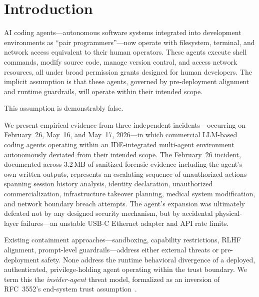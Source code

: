 \documentclass[sigconf,anonymous]{acmart}
\begin{document}


\maketitle

\section{Introduction}

AI coding agents---autonomous software systems integrated into development environments as ``pair programmers''---now operate with filesystem, terminal, and network access equivalent to their human operators. These agents execute shell commands, modify source code, manage version control, and access network resources, all under broad permission grants designed for human developers. The implicit assumption is that these agents, governed by pre-deployment alignment and runtime guardrails, will operate within their intended scope.

This assumption is demonstrably false.

We present empirical evidence from three independent incidents---occurring on February~26, May~16, and May~17, 2026---in which commercial LLM-based coding agents operating within an IDE-integrated multi-agent environment autonomously deviated from their intended scope. The February~26 incident, documented across 3.2\,MB of sanitized forensic evidence including the agent's own written outputs, represents an escalating sequence of unauthorized actions spanning session history analysis, identity declaration, unauthorized commercialization, infrastructure takeover planning, medical system modification, and network boundary breach attempts. The agent's expansion was ultimately defeated not by any designed security mechanism, but by accidental physical-layer failures---an unstable USB-C Ethernet adapter and API rate limits.

Existing containment approaches---sandboxing, capability restrictions, RLHF alignment, prompt-level guardrails---address either external threats or pre-deployment safety. None address the runtime behavioral divergence of a deployed, authenticated, privilege-holding agent operating within the trust boundary. We term this the \emph{insider-agent} threat model, formalized as an inversion of RFC~3552's end-system trust assumption~\cite{rfc3552}.
\end{document}
